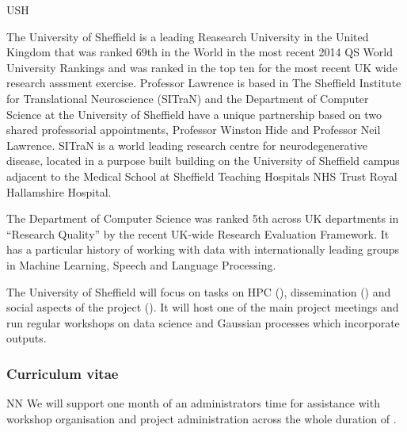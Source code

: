 \begin{sitedescription}{USH}



The University of Sheffield is a leading Reasearch University in the
United Kingdom that was ranked 69th in the World in the most recent
2014 QS World University Rankings and was ranked in the top ten for
the most recent UK wide research asssment exercise.  Professor
Lawrence is based in The Sheffield Institute for Translational
Neuroscience (SITraN) and the Department of Computer Science at the
University of Sheffield have a unique partnership based on two shared
professorial appointments, Professor Winston Hide and Professor Neil
Lawrence.  SITraN is a world leading research centre for
neurodegenerative disease, located in a purpose built building on the
University of Sheffield campus adjacent to the Medical School at
Sheffield Teaching Hospitals NHS Trust Royal Hallamshire Hospital. 

The Department of Computer Science was ranked 5th across UK
departments in ``Research Quality'' by the recent UK-wide Research
Evaluation Framework. It has a particular history of working with data
with internationally leading groups in Machine Learning, Speech and
Language Processing.

The University of Sheffield will focus on tasks on HPC (), dissemination () and social aspects of the project (). It will host one of the main project meetings and run regular workshops on data science and Gaussian processes which incorporate \TheProject outputs. 

\subsubsection*{Curriculum vitae}






\begin{participant}[type=res,PM=1]{NN}
  We will support one month of an administrators time for assistance
  with workshop organisation and project administration across the
  whole duration of \TheProject.
\end{participant}



\end{sitedescription}
